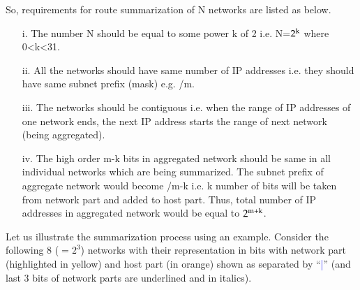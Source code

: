 \begin{multicols}{2}
So, requirements for route summarization of N networks are listed as below. 

\vspace{-.3cm}

\begin{itemize}
\item[i.] The number N should be equal to some power k of 2 i.e. N=$2^{\rm k}$ where 0<k<31.
\item[ii.] All the networks should have same number of IP addresses i.e. they should have same subnet prefix (mask) e.g. /m.
\item[iii.] The networks should be contiguous i.e. when the range of IP addresses of one network ends, the next IP address starts the range of next network (being aggregated).
\item[iv.] The high order m-k bits in aggregated network should be same in all individual networks which are being summarized. The subnet prefix of aggregate network would become /m-k i.e. k number of bits will be taken from network part and added to host part. Thus, total number of IP addresses in aggregated network would be equal to $2^{\rm m+k}$.
\end{itemize}

Let us illustrate the summarization process using an example. Consider the following 8 ($=2^{3}$) networks with their representation in bits with network part (highlighted in yellow) and host part (in orange) shown as separated by “\textcolor{blue}{|}” (and last 3 bits of network parts are underlined and in italics).

\vspace{-.3cm}


\end{multicols}
